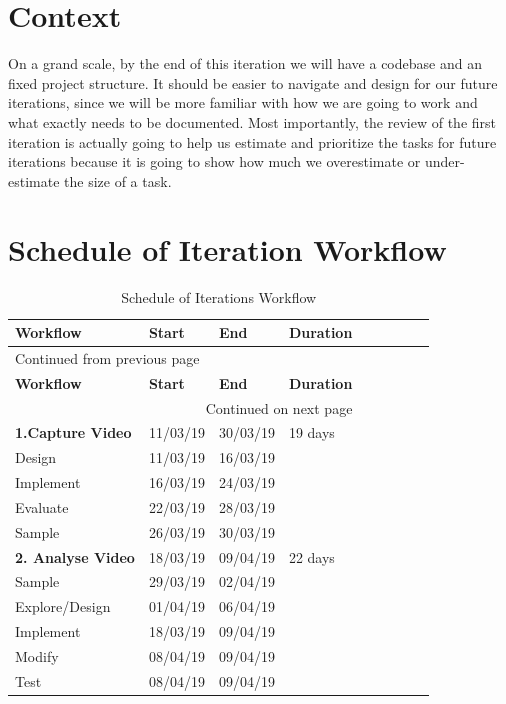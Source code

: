 \documentclass[12pt,a4paper,man]{report}
\begin{document}
\section{Context}
\label{sec:orgd2522e1}
On a grand scale, by the end of this iteration we will have a codebase and an fixed project structure. It should be easier to navigate and design for our future iterations, since we will be more familiar with how we are going to work and what exactly needs to be documented. Most importantly, the review of the first iteration is actually going to help us estimate and prioritize the tasks for future iterations because it is going to show how much we overestimate or under-estimate the size of a task.

\section{Schedule of Iteration Workflow}
\label{sec:org093b884}
\begin{longtable}{|l|l|l|l|l|l|l|lp{3cm}|}
\caption{\label{table:iterwork}
Schedule of Iterations Workflow}
\\
\hline
\textbf{Workflow} & \textbf{Start} & \textbf{End} & \textbf{Duration}\\
\hline
\endfirsthead
\multicolumn{4}{l}{Continued from previous page} \\
\hline

\textbf{Workflow} & \textbf{Start} & \textbf{End} & \textbf{Duration} \\

\hline
\endhead
\hline\multicolumn{4}{r}{Continued on next page} \\
\endfoot
\endlastfoot
\hline
\textbf{1.Capture Video} & 11/03/19 & 30/03/19 & 19 days\\
Design & 11/03/19 & 16/03/19 & \\
Implement & 16/03/19 & 24/03/19 & \\
Evaluate & 22/03/19 & 28/03/19 & \\
Sample & 26/03/19 & 30/03/19 & \\
\hline
\textbf{2. Analyse Video} & 18/03/19 & 09/04/19 & 22 days\\
Sample & 29/03/19 & 02/04/19 & \\
Explore/Design & 01/04/19 & 06/04/19 & \\
Implement & 18/03/19 & 09/04/19 & \\
Modify & 08/04/19 & 09/04/19 & \\
Test & 08/04/19 & 09/04/19 & \\
\hline
\end{longtable}
\end{document}
